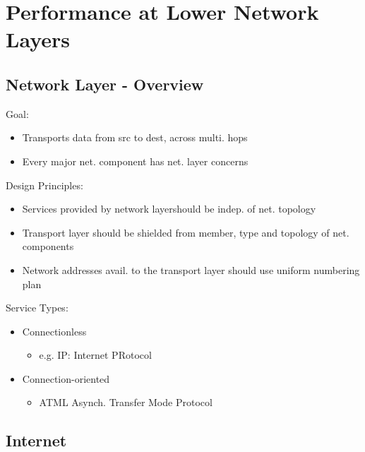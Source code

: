 \section{Performance at Lower Network Layers}
\subsection{Network Layer - Overview}
Goal:
\begin{itemize}
	\item Transports data from src to dest, across multi. hops
	\item Every major net. component has net. layer concerns
\end{itemize}
Design Principles:
\begin{itemize}
	\item Services provided by network layershould be indep. of net.
		topology
	\item Transport layer should be shielded from member, type and topology
		of net. components
	\item Network addresses avail. to the transport layer should use uniform
		numbering plan
\end{itemize}
Service Types:
\begin{itemize}
	\item Connectionless
	\begin{itemize}
		\item e.g. IP: Internet PRotocol
	\end{itemize}
	\item Connection-oriented
	\begin{itemize}
		\item ATML Asynch. Transfer Mode Protocol
	\end{itemize}
\end{itemize}
\subsection{Internet}
